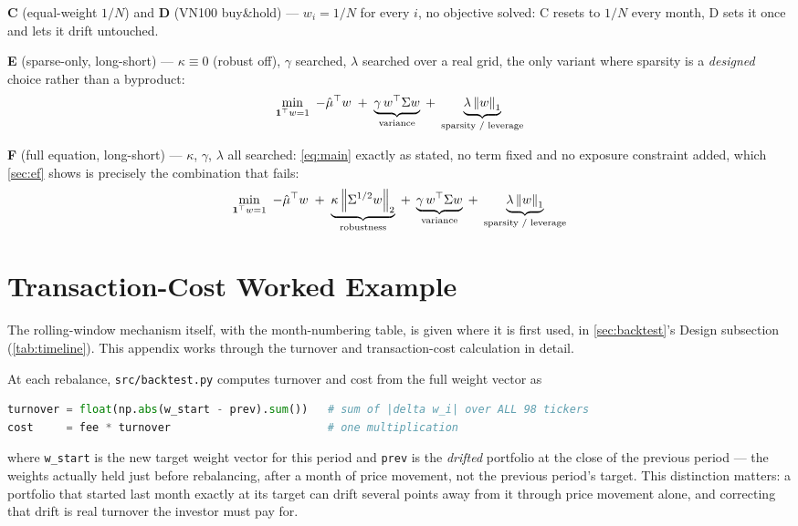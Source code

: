 \textbf{C} (equal-weight $1/N$) and \textbf{D} (VN100 buy\&hold) --- $w_i = 1/N$ for every $i$, no
objective solved: C resets to $1/N$ every month, D sets it once and lets it drift untouched.

\textbf{E} (sparse-only, long-short) --- $\kappa\equiv0$ (robust off), $\gamma$ searched, $\lambda$
searched over a real grid, the only variant where sparsity is a \emph{designed} choice rather than
a byproduct:
\[
\min_{\mathbf1^\top w=1}\ -\hat{\mu}^\top w
  \;+\; \underbrace{\gamma\, w^\top\Sigma w}_{\text{variance}}
  \;+\; \underbrace{\lambda\left\lVert w \right\rVert_1}_{\text{sparsity / leverage}}
\]

\textbf{F} (full equation, long-short) --- $\kappa$, $\gamma$, $\lambda$ all searched:
\cref{eq:main} exactly as stated, no term fixed and no exposure constraint added, which
\cref{sec:ef} shows is precisely the combination that fails:
\[
\min_{\mathbf1^\top w=1}\ -\hat{\mu}^\top w
  \;+\; \underbrace{\kappa\left\lVert \Sigma^{1/2} w \right\rVert_2}_{\text{robustness}}
  \;+\; \underbrace{\gamma\, w^\top\Sigma w}_{\text{variance}}
  \;+\; \underbrace{\lambda\left\lVert w \right\rVert_1}_{\text{sparsity / leverage}}
\]

\section{Transaction-Cost Worked Example}\label{app:timeline}

The rolling-window mechanism itself, with the month-numbering table, is given where it is first
used, in \cref{sec:backtest}'s Design subsection (\cref{tab:timeline}). This appendix works
through the turnover and transaction-cost calculation in detail.

At each rebalance, \texttt{src/backtest.py} computes turnover and cost from the full weight
vector as
\begin{lstlisting}[language=Python, numbers=none]
turnover = float(np.abs(w_start - prev).sum())   # sum of |delta w_i| over ALL 98 tickers
cost     = fee * turnover                        # one multiplication
\end{lstlisting}
where \texttt{w\_start} is the new target weight vector for this period and \texttt{prev} is
the \emph{drifted} portfolio at the close of the previous period --- the weights actually held
just before rebalancing, after a month of price movement, not the previous period's target.
This distinction matters: a portfolio that started last month exactly at its target can drift
several points away from it through price movement alone, and correcting that drift is real
turnover the investor must pay for.

